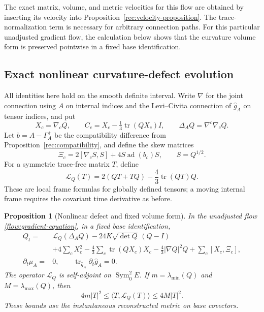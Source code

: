 \documentclass[11pt]{article}
\numberwithin{equation}{section}
\newtheorem{proposition}[theorem]{Proposition}
\theoremstyle{definition}
\theoremstyle{remark}
\begin{document}
The exact matrix, volume, and metric velocities for this flow are obtained
by inserting its velocity into Proposition~\ref{rec:velocity-proposition}.
The trace-normalization term is necessary for arbitrary connection paths.
For this particular unadjusted gradient flow, the calculation below shows
that the curvature volume form is preserved pointwise in a fixed base
identification.


\subsection{Exact nonlinear curvature-defect evolution}
\label{subsec:nonlinear-Q}

All identities here hold on the smooth definite interval. Write $\nabla$
for the joint connection using $A$ on internal indices and the
Levi--Civita connection of $\widehat g_A$ on tensor indices, and put
\[
 X_c=\nabla_cQ,\qquad
 C_c=X_c-\tfrac13\operatorname{tr}(QX_c)I,\qquad
 \Delta_AQ=\nabla^c\nabla_cQ .
\]
Let $b=A-\Gamma_A^+$ be the compatibility difference from
Proposition~\ref{rec:compatibility}, and define the skew matrices
\[
 \Xi_c=2[\nabla_cS,S]+4S\operatorname{ad}(b_c)S,
 \qquad S=Q^{1/2}.
\]
For a symmetric trace-free matrix $T$, define
\begin{equation}\label{flow:nonlinear-principal}
 \mathscr L_Q(T)=2(QT+TQ)-\frac43\operatorname{tr}(QT)Q.
\end{equation}
These are local frame formulas for globally defined tensors; a moving
internal frame requires the covariant time derivative as before.

\begin{proposition}[Nonlinear defect and fixed volume form]
\label{prop:nonlinear-Q}
In the unadjusted flow \eqref{flow:gradient-equation}, in a fixed base
identification,
\begin{align}
 Q_t={}&\mathscr L_Q(\Delta_AQ)
       -24K\sqrt{\det Q}\,(Q-I)\nonumber\\
 &+4\sum_cX_c^2-\frac43\sum_c\operatorname{tr}(QX_c)X_c
       -\frac43|\nabla Q|^2Q+\sum_c[X_c,\Xi_c],
 \label{flow:nonlinear-Q}\\
 \partial_t\mu_A={}&0,
 \qquad \operatorname{tr}_{\widehat g_A}\partial_t\widehat g_A=0.
 \label{flow:pointwise-volume}
\end{align}
The operator $\mathscr L_Q$ is self-adjoint on $\operatorname{Sym}^2_0E$.
If $m=\lambda_{\min}(Q)$ and $M=\lambda_{\max}(Q)$, then
\begin{equation}\label{flow:principal-coercivity}
 4m|T|^2\leq\langle T,\mathscr L_Q(T)\rangle\leq4M|T|^2.
\end{equation}
These bounds use the instantaneous reconstructed metric on base covectors.
\end{proposition}
\end{document}
